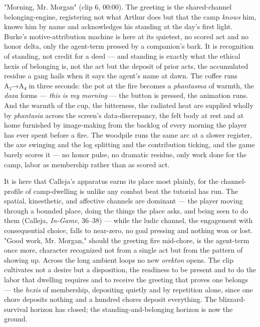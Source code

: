 \documentclass{article}
\begin{document}
"Morning, Mr. Morgan" (clip 6, 00:00). The greeting is the shared-channel belonging-engine, registering not what Arthur does but that the camp \textit{knows} him, knows him by name and acknowledges his standing at the day's first light. Burke's motive-attribution machine is here at its quietest, no scored act and no honor delta, only the agent-term pressed by a companion's bark. It is recognition of standing, not credit for a deed — and standing is exactly what the ethical hexis of belonging is, not the act but the deposit of prior acts, the accumulated residue a gang hails when it says the agent's name at dawn. The coffee runs A₂→A₄ in three seconds: the pot at the fire becomes a \textit{phantasma} of warmth, the \textit{doxa} forms — \textit{this is my morning} — the button is pressed, the animation runs. And the warmth of the cup, the bitterness, the radiated heat are supplied wholly by \textit{phantasia} across the screen's data-discrepancy, the felt body at rest and at home furnished by image-making from the backlog of every morning the player has ever spent before a fire. The woodpile runs the same arc at a slower register, the axe swinging and the log splitting and the contribution ticking, and the game barely scores it — no honor pulse, no dramatic residue, only work done for the camp, labor as membership rather than as scored act.

It is here that Calleja's apparatus earns its place most plainly, for the channel-profile of camp-dwelling is unlike any combat beat the tutorial has run. The spatial, kinesthetic, and affective channels are dominant — the player moving through a bounded place, doing the things the place asks, and being seen to do them (Calleja, \textit{In-Game}, 36–38) — while the ludic channel, the engagement with consequential choice, falls to near-zero, no goal pressing and nothing won or lost. "Good work, Mr. Morgan," should the greeting fire mid-chore, is the agent-term once more, character recognized not from a single act but from the pattern of showing up. Across the long ambient loops no new \textit{orekton} opens. The clip cultivates not a desire but a disposition, the readiness to be present and to do the labor that dwelling requires and to receive the greeting that proves one belongs — the \textit{hexis} of membership, depositing quietly and by repetition alone, since one chore deposits nothing and a hundred chores deposit everything. The blizzard-survival horizon has closed; the standing-and-belonging horizon is now the ground.
\end{document}
